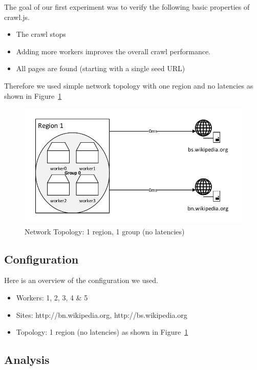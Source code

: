 The goal of our first experiment was to verify the following basic properties of crawl.js.

\begin{itemize}
  \item The crawl stops
  \item Adding more workers improves the overall crawl performance.
  \item All pages are found (starting with a single seed URL)
\end{itemize}

Therefore we used simple network topology with one region and no latencies as shown in Figure~\ref{topology_exp1}

\begin{figure}[h]
\centering
  \includegraphics[width=1.0\textwidth]{Figures/topology_exp1.pdf}
  \caption{Network Topology: 1 region, 1 group (no latencies)}
\label{topology_exp1}
\end{figure}

\subsection{Configuration}

Here is an overview of the configuration we used.

\begin{itemize}
  \item Workers: 1, 2, 3, 4 \& 5
  \item Sites: http://bn.wikipedia.org, http://bs.wikipedia.org
  \item Topology: 1 region (no latencies) as shown in Figure~\ref{topology_exp1}
\end{itemize}

\subsection{Analysis}

